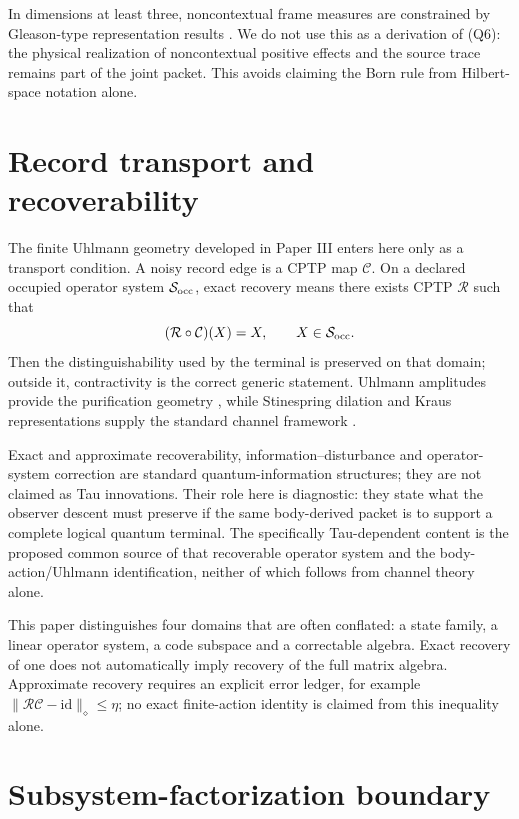 \documentclass[11pt]{article}
\begin{document}
In dimensions at least three, noncontextual frame measures are constrained by
Gleason-type representation results \citep{Gleason1957}.  We do not use this
as a derivation of (Q6): the physical realization of noncontextual positive
effects and the source trace remains part of the joint packet.  This avoids
claiming the Born rule from Hilbert-space notation alone.

\section{Record transport and recoverability}

The finite Uhlmann geometry developed in Paper III enters here only as a
transport condition.  A noisy record edge is a CPTP map $\mathcal C$.  On a
declared occupied operator system $\mathcal S_{\rm occ}$, exact recovery means
there exists CPTP $\mathcal R$ such that
\begin{equation}
 (\mathcal R\circ\mathcal C)(X)=X,
 \qquad X\in\mathcal S_{\rm occ}.
 \label{eq:recovery}
\end{equation}
Then the distinguishability used by the terminal is preserved on that domain;
outside it, contractivity is the correct generic statement.  Uhlmann
amplitudes provide the purification geometry \citep{Uhlmann1976}, while
Stinespring dilation and Kraus representations supply the standard channel
framework \citep{Stinespring1955,Kraus1971}.

Exact and approximate recoverability, information--disturbance and
operator-system correction are standard quantum-information structures; they
are not claimed as Tau innovations.  Their role here is diagnostic: they state
what the observer descent must preserve if the same body-derived packet is to
support a complete logical quantum terminal.  The specifically Tau-dependent
content is the proposed common source of that recoverable operator system and
the body-action/Uhlmann identification, neither of which follows from channel
theory alone.

This paper distinguishes four domains that are often conflated: a state
family, a linear operator system, a code subspace and a correctable algebra.
Exact recovery of one does not automatically imply recovery of the full matrix
algebra.  Approximate recovery requires an explicit error ledger, for example
$\|\mathcal R\mathcal C-\mathrm{id}\|_\diamond\le\eta$; no exact finite-action
identity is claimed from this inequality alone.

\section{Subsystem-factorization boundary}
\end{document}
